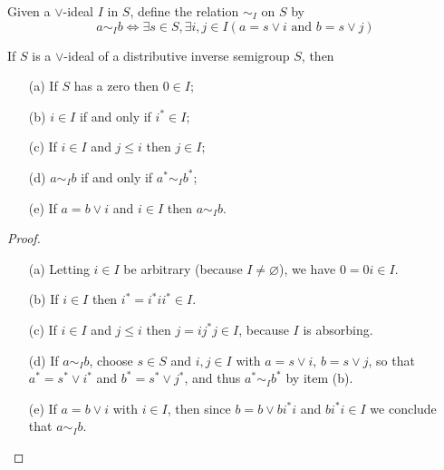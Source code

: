 Given a $\lor$-ideal $I$ in $S$, define the relation $\sim_I$ on $S$ by
\[a\sim_I b\iff\exists s\in S,\exists i,j\in I\left(a=s\lor i\text{ and }b=s\lor j\right)\]

\begin{lemma}\label{lemmaquotientinversesemigroup}
If $S$ is a $\lor$-ideal of a distributive inverse semigroup $S$, then
\begin{enumerate}
\item[(a)] If $S$ has a zero then $0\in I$;
\item[(b)] $i\in I$ if and only if $i^*\in I$;
\item[(c)] If $i\in I$ and $j\leq i$ then $j\in I$;
\item[(d)] $a\sim_I b$ if and only if $a^*\sim_I b^*$;
\item[(e)] If $a=b\lor i$ and $i\in I$ then $a\sim_I b$.
\end{enumerate}
\end{lemma}
\begin{proof}
\begin{enumerate}
\item[(a)] Letting $i\in I$ be arbitrary (because $I\neq\varnothing$), we have $0=0i\in I$.
\item[(b)] If $i\in I$ then $i^*=i^*ii^*\in I$.
\item[(c)] If $i\in I$ and $j\leq i$ then $j=ij^*j\in I$, because $I$ is absorbing.
\item[(d)] If $a\sim_I b$, choose $s\in S$ and $i,j\in I$ with $a=s\lor i$, $b=s\lor j$, so that $a^*=s^*\lor i^*$ and $b^*=s^*\lor j^*$, and thus $a^*\sim_Ib^*$ by item (b).
\item[(e)] If $a=b\lor i$ with $i\in I$, then since $b=b\lor bi^*i$ and $bi^*i\in I$ we conclude that $a\sim_I b$.\qedhere
\end{enumerate}
\end{proof}

